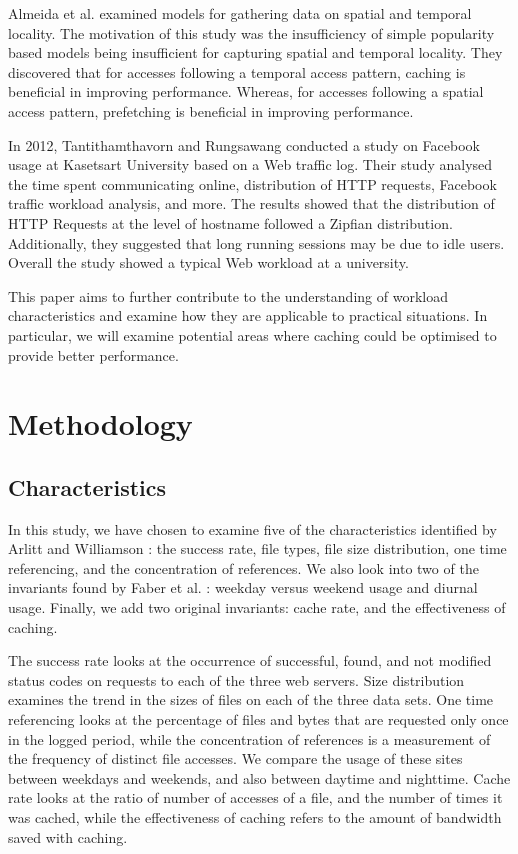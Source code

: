 \documentclass[10pt,conference]{IEEEtran}
\begin{document}
Almeida et al. \cite{reference_locality} examined models for gathering data on spatial and temporal locality. The motivation of this study was the insufficiency of simple popularity based models being insufficient for capturing spatial and temporal locality. They discovered that for accesses following a temporal access pattern, caching is beneficial in improving performance. Whereas, for accesses following a spatial access pattern, prefetching is beneficial in improving performance.

In 2012, Tantithamthavorn and Rungsawang \cite{facebook} conducted a study on Facebook usage at Kasetsart University based on a Web traffic log. Their study analysed the time spent communicating online, distribution of HTTP requests, Facebook traffic workload analysis, and more. The results showed that the distribution of HTTP Requests at the level of hostname followed a Zipfian distribution. Additionally, they suggested that long running sessions may be due to idle users. Overall the study showed a typical Web workload at a university.

This paper aims to further contribute to the understanding of workload characteristics and examine how they are applicable to practical situations. In particular, we will examine potential areas where caching could be optimised to provide better performance.

\section{Methodology}\label{methodology}
\subsection{Characteristics}\label{lab:characteristics}
In this study, we have chosen to examine five of the characteristics identified by Arlitt and Williamson \cite{keynote}: the success rate, file types, file size distribution, one time referencing, and the concentration of references. We also look into two of the invariants found by Faber et al. \cite{Faber}: weekday versus weekend usage and diurnal usage. Finally, we add two original invariants: cache rate, and the effectiveness of caching.

The success rate looks at the occurrence of successful, found, and not modified status codes on requests to each of the three web servers. Size distribution examines the trend in the sizes of files on each of the three data sets. One time referencing looks at the percentage of files and bytes that are requested only once in the logged period, while the concentration of references is a measurement of the frequency of distinct file accesses. We compare the usage of these sites between weekdays and weekends, and also between daytime and nighttime. Cache rate looks at the ratio of number of accesses of a file, and the number of times it was cached, while the effectiveness of caching refers to the amount of bandwidth saved with caching.
\end{document}
